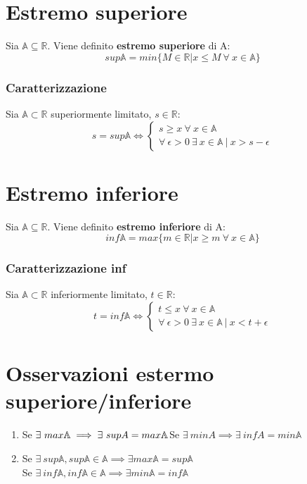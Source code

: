 \section{Estremo superiore}
Sia $\mathbb{A} \subseteq \mathbb{R}$. Viene definito \textbf{estremo superiore} di A:
\begin{equation}
sup\mathbb{A} = min\{M \in \mathbb{R} | x \leq M\ \forall\ x \in \mathbb{A}\}
\end{equation}
\subsubsection{Caratterizzazione}
Sia $\mathbb{A} \subset \mathbb{R}$ superiormente limitato, $s \in \mathbb{R}$:\\
\begin{equation}
	s=sup\mathbb{A} \iff
	\begin{cases}
	s \geq x\ \forall\ x \in \mathbb{A}\\
	\forall\ \epsilon > 0\ \exists\ x \in \mathbb{A}\ |\ x > s-\epsilon
	\end{cases}
\end{equation}
\section{Estremo inferiore}
Sia $\mathbb{A} \subseteq \mathbb{R}$. Viene definito \textbf{estremo inferiore} di A:
\begin{equation}
inf\mathbb{A} = max\{m \in \mathbb{R} | x \geq m\ \forall\ x \in \mathbb{A}\}
\end{equation}
\subsubsection{Caratterizzazione inf}
Sia $\mathbb{A} \subset \mathbb{R}$ inferiormente limitato, $t \in \mathbb{R}$:\\
\begin{equation}
	t=inf\mathbb{A} \iff
	\begin{cases}
	t \leq x\ \forall\ x \in \mathbb{A}\\
	\forall\ \epsilon > 0\ \exists\ x \in \mathbb{A}\ |\ x < t+\epsilon
	\end{cases}
\end{equation}

\section{Osservazioni estermo superiore/inferiore}
\begin{enumerate}
\item Se $\exists\ max\mathbb{A} \implies \exists\ supA=max\mathbb{A}\\
$Se $\exists\ minA \implies \exists\ infA=min\mathbb{A}$
\item Se $\exists\ sup\mathbb{A}, sup\mathbb{A} \in \mathbb{A} \implies \exists max\mathbb{A} = sup\mathbb{A}$\\
Se $\exists\ inf\mathbb{A}, inf\mathbb{A} \in \mathbb{A} \implies \exists min\mathbb{A} = inf\mathbb{A}$
\end{enumerate}

